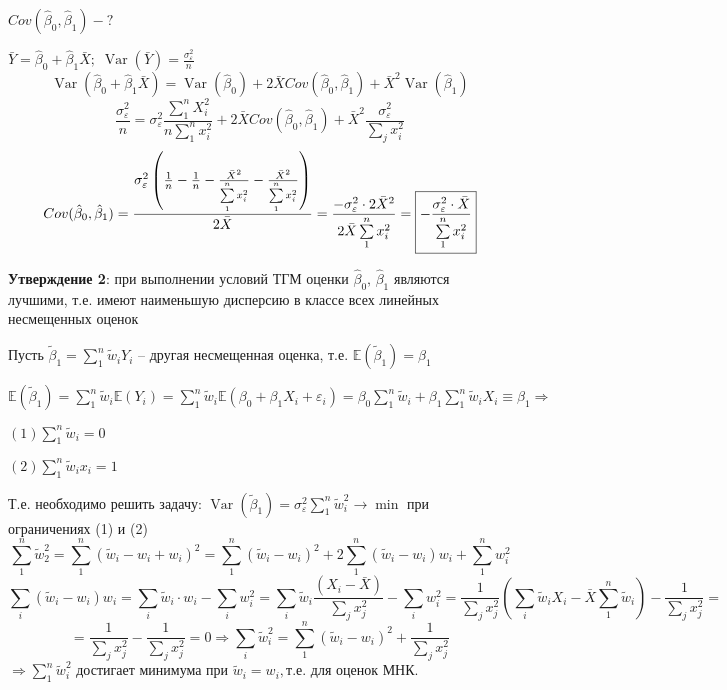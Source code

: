 \documentclass[12pt]{article}
\newcommand{\e}{\mathbb{E}}
\DeclareMathOperator{\var}{Var}
\renewcommand{\epsilon}{\varepsilon}
\newcommand{\msum}{\sum\limits_1^n}
\newcommand{\isum}{\sum\limits_i}
\newcommand{\jsum}{\sum\limits_j}
\begin{document}
$\displaystyle Cov(\hat{\beta}_0, \hat{\beta}_1) - ?$

$\displaystyle\bar{Y} = \hat{\beta}_0 + \hat{\beta}_1 \bar{X}; \; \var(\bar{Y}) = \frac{\sigma_{\epsilon}^2}{n}$
$$\var(\hat{\beta}_0 + \hat{\beta}_1 \bar{X}) = \var(\hat{\beta}_0) + 2 \bar{X} Cov(\hat{\beta}_0, \hat{\beta}_1) + \bar{X}^2 \var(\hat{\beta}_1)$$
$$\frac{\sigma_{\epsilon}^2}{n} = \sigma_{\epsilon}^2 \frac{\msum X_i^2}{n \msum x_i^2} + 2 \bar{X} Cov(\hat{\beta}_0, \hat{\beta}_1) + \bar{X}^2 \frac{\sigma_{\epsilon}^2}{\jsum x_i^2}$$
$$Cov(\hat{\beta}_0, \hat{\beta}_1) = \frac{\sigma_{\epsilon}^2 \left(\frac{1}{n} - \frac{1}{n} -  \frac{\bar{X}^2}{\msum x_i^2} - \frac{\bar{X}^2}{\msum x_i^2}\right)}{2\bar{X}} = \displaystyle\frac{- \sigma_{\epsilon}^2 \cdot 2 \bar{X}^2}{2 \bar{X} \msum x_i^2} = \fbox{\text{$\displaystyle -\frac{\sigma_{\epsilon}^2 \cdot \bar{X}}{\msum x_i^2}$}}$$

\textbf{Утверждение 2}: при выполнении условий ТГМ оценки $\hat{\beta}_0, \, \hat{\beta}_1$ являются лучшими, т.е. имеют наименьшую дисперсию в классе всех линейных несмещенных оценок

Пусть $\tilde{\beta}_1 = \msum \tilde{w}_i Y_i$ -- другая несмещенная оценка, т.е. $\e(\tilde{\beta}_1) = \beta_1$

$\displaystyle\e(\tilde{\beta}_1) = \msum \tilde{w}_i \e(Y_i) = \msum \tilde{w}_i \e(\beta_0 + \beta_1 X_i + \epsilon_i) = \beta_0 \msum \tilde{w}_i + \beta_1 \msum \tilde{w}_i X_i \equiv \beta_1 \Rightarrow \; \; \;$
\begin{minipage}{0.3\textwidth}
$\displaystyle(1) \msum \tilde{w}_i = 0$

$\displaystyle(2) \msum \tilde{w}_i x_i = 1$
\end{minipage}

Т.е. необходимо решить задачу:
$\displaystyle \var(\tilde{\beta}_1) = \sigma_{\epsilon}^2 \msum \tilde{w}_i^2 \rightarrow \min$ при ограничениях (1) и (2)
$$\msum \tilde{w}_2^2 = \msum(\tilde{w}_i - w_i + w_i)^2 = \msum(\tilde{w}_i - w_i)^2 + 2\msum(\tilde{w}_i - w_i)w_i + \msum w_i^2$$
$$\isum (\tilde{w}_i - w_i) w_i = \isum \tilde{w}_i \cdot w_i - \isum w_i^2 = \isum \tilde{w}_i \frac{(X_i - \bar{X})}{\jsum x_j^2} - \isum w_i^2 = \frac{1}{\jsum x_j^2} \left(\isum \tilde{w}_i X_i - \bar{X} \msum \tilde{w}_i\right) - \frac{1}{\jsum x_j^2} =$$
$$= \frac{1}{\jsum x_j^2} - \frac{1}{\jsum x_j^2} = 0 \Rightarrow \isum \tilde{w}_i^2 = \msum(\tilde{w}_i - w_i)^2 + \frac{1}{\jsum x_j^2}$$
$\Rightarrow \msum \tilde{w}_i^2 \text{ достигает минимума при } \tilde{w}_i = w_i, \text{т.е. для оценок МНК.}$
\end{document}
